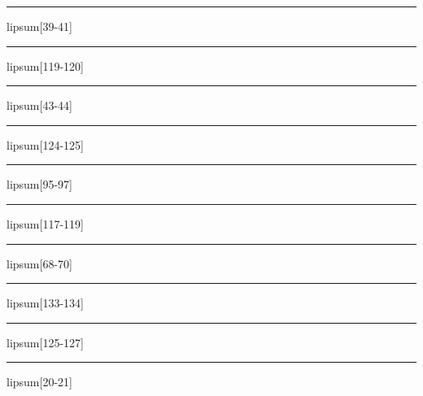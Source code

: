 \documentclass[11pt,a4paper]{article}
\begin{document}
\begin{simplewrap}
  \textcolor{magenta!26}{\rule{4.6cm}{10.0cm}}
\end{simplewrap}
lipsum[39-41]

\begin{simplewrap}
  \textcolor{magenta!59}{\rule{4.8cm}{8.9cm}}
\end{simplewrap}
lipsum[119-120]

\begin{simplewrap}
  \textcolor{green!35}{\rule{4.1cm}{2.1cm}}
\end{simplewrap}
lipsum[43-44]

\begin{simplewrap}
  \textcolor{purple!38}{\rule{3.5cm}{6.5cm}}
\end{simplewrap}
lipsum[124-125]

\begin{simplewrap}
  \textcolor{blue!24}{\rule{5.3cm}{3.9cm}}
\end{simplewrap}
lipsum[95-97]

\begin{simplewrap}
  \textcolor{yellow!43}{\rule{5.7cm}{4.9cm}}
\end{simplewrap}
lipsum[117-119]

\begin{simplewrap}
  \textcolor{blue!51}{\rule{4.0cm}{7.6cm}}
\end{simplewrap}
lipsum[68-70]

\begin{simplewrap}
  \textcolor{cyan!34}{\rule{5.0cm}{4.9cm}}
\end{simplewrap}
lipsum[133-134]

\begin{simplewrap}
  \textcolor{magenta!43}{\rule{4.2cm}{8.5cm}}
\end{simplewrap}
lipsum[125-127]

\begin{simplewrap}
  \textcolor{red!42}{\rule{5.6cm}{5.5cm}}
\end{simplewrap}
lipsum[20-21]
\end{document}
